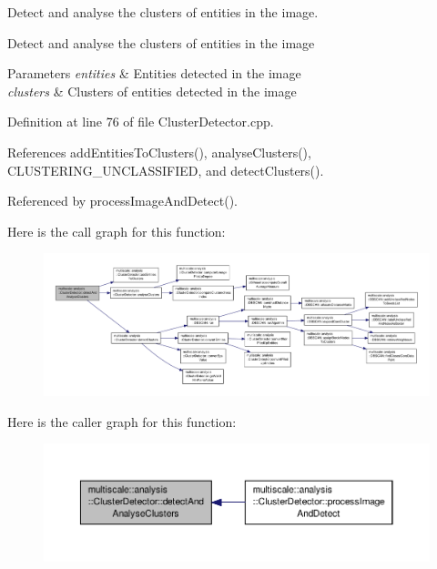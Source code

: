 Detect and analyse the clusters of entities in the image. 

Detect and analyse the clusters of entities in the image


\begin{DoxyParams}{Parameters}
{\em entities} & Entities detected in the image \\
\hline
{\em clusters} & Clusters of entities detected in the image \\
\hline
\end{DoxyParams}


Definition at line 76 of file Cluster\-Detector.\-cpp.



References add\-Entities\-To\-Clusters(), analyse\-Clusters(), C\-L\-U\-S\-T\-E\-R\-I\-N\-G\-\_\-\-U\-N\-C\-L\-A\-S\-S\-I\-F\-I\-E\-D, and detect\-Clusters().



Referenced by process\-Image\-And\-Detect().



Here is the call graph for this function\-:\nopagebreak
\begin{figure}[H]
\begin{center}
\leavevmode
\includegraphics[width=350pt]{classmultiscale_1_1analysis_1_1ClusterDetector_a46f98e066e74171774f0b6728118bc7b_cgraph}
\end{center}
\end{figure}




Here is the caller graph for this function\-:\nopagebreak
\begin{figure}[H]
\begin{center}
\leavevmode
\includegraphics[width=350pt]{classmultiscale_1_1analysis_1_1ClusterDetector_a46f98e066e74171774f0b6728118bc7b_icgraph}
\end{center}
\end{figure}


